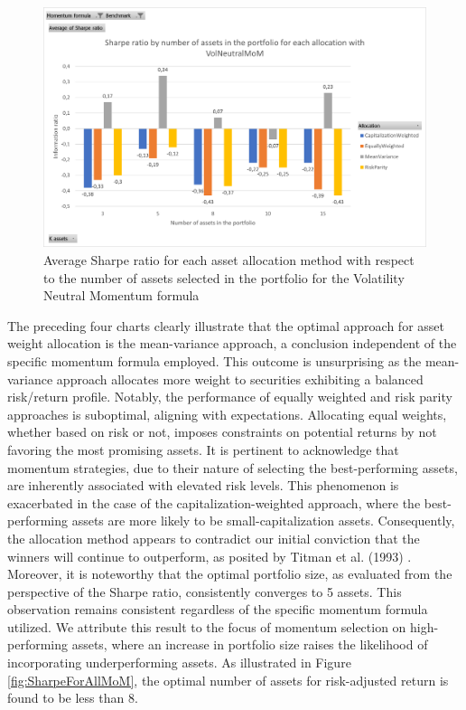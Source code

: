 \documentclass{article}
\begin{document}
\begin{figure}[H] %
    \centering
    \includegraphics[width=0.75\linewidth]{absolute_management/Sharpe ratio VolNeutalMoM.png}
    \caption{Average Sharpe ratio for each asset allocation method with respect to the number of assets selected in the portfolio for the Volatility Neutral Momentum formula}
    \label{fig:Sharpe ratio VolNeutMOM}
\end{figure}

The preceding four charts clearly illustrate that the optimal approach for asset weight allocation is the mean-variance approach, a conclusion independent of the specific momentum formula employed. This outcome is unsurprising as the mean-variance approach allocates more weight to securities exhibiting a balanced risk/return profile. Notably, the performance of equally weighted and risk parity approaches is suboptimal, aligning with expectations. Allocating equal weights, whether based on risk or not, imposes constraints on potential returns by not favoring the most promising assets. It is pertinent to acknowledge that momentum strategies, due to their nature of selecting the best-performing assets, are inherently associated with elevated risk levels. This phenomenon is exacerbated in the case of the capitalization-weighted approach, where the best-performing assets are more likely to be small-capitalization assets. Consequently, the allocation method appears to contradict our initial conviction that the winners will continue to outperform, as posited by Titman et al. (1993) \cite{Titman1993}.\newline
Moreover, it is noteworthy that the optimal portfolio size, as evaluated from the perspective of the Sharpe ratio, consistently converges to 5 assets. This observation remains consistent regardless of the specific momentum formula utilized. We attribute this result to the focus of momentum selection on high-performing assets, where an increase in portfolio size raises the likelihood of incorporating underperforming assets. As illustrated in Figure \ref{fig:SharpeForAllMoM}, the optimal number of assets for risk-adjusted return is found to be less than 8.
\end{document}
